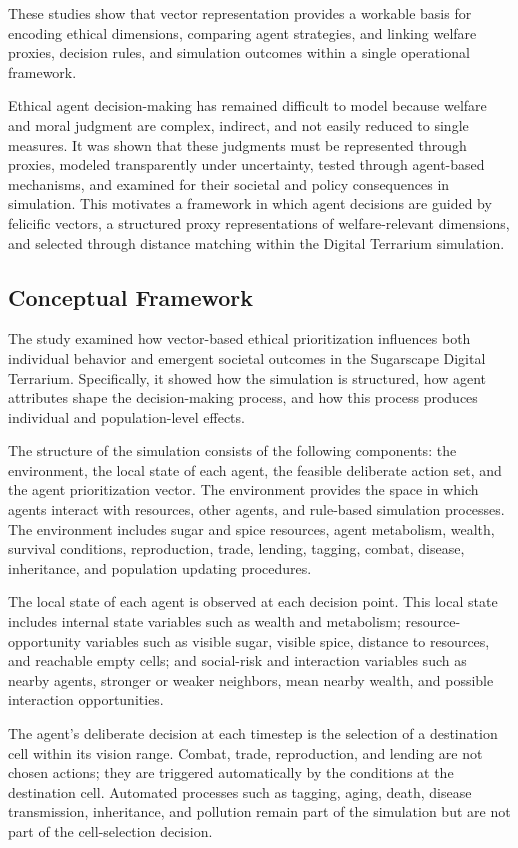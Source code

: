\documentclass{icsthesis}
\begin{document}
\begin{mainmatter}
These studies show that vector representation provides a workable basis for encoding ethical dimensions, comparing agent strategies, and linking welfare proxies, decision rules, and simulation outcomes within a single operational framework.

Ethical agent decision-making has remained difficult to model because welfare and moral judgment are complex, indirect, and not easily reduced to single measures. It was shown that these judgments must be represented through proxies, modeled transparently under uncertainty, tested through agent-based mechanisms, and examined for their societal and policy consequences in simulation. This motivates a framework in which agent decisions are guided by felicific vectors, a structured proxy representations of welfare-relevant dimensions, and selected through distance matching within the Digital Terrarium simulation.

			\subsection{Conceptual Framework}
The study examined how vector-based ethical prioritization influences both individual behavior and emergent societal outcomes in the Sugarscape Digital Terrarium. Specifically, it showed how the simulation is structured, how agent attributes shape the decision-making process, and how this process produces individual and population-level effects.

The structure of the simulation consists of the following components: the environment, the local state of each agent, the feasible deliberate action set, and the agent prioritization vector. 
The environment provides the space in which agents interact with resources, other agents, and rule-based simulation processes. The environment includes sugar and spice resources, agent metabolism, wealth, survival conditions, reproduction, trade, lending, tagging, combat, disease, inheritance, and population updating procedures.

The local state of each agent is observed at each decision point. This local state includes internal state variables such as wealth and metabolism; resource-opportunity variables such as visible sugar, visible spice, distance to resources, and reachable empty cells; and social-risk and interaction variables such as nearby agents, stronger or weaker neighbors, mean nearby wealth, and possible interaction opportunities.

The agent's deliberate decision at each timestep is the selection of a destination cell within its vision range. Combat, trade, reproduction, and lending are not chosen actions; they are triggered automatically by the conditions at the destination cell. Automated processes such as tagging, aging, death, disease transmission, inheritance, and pollution remain part of the simulation but are not part of the cell-selection decision.


\end{mainmatter}
\end{document}
